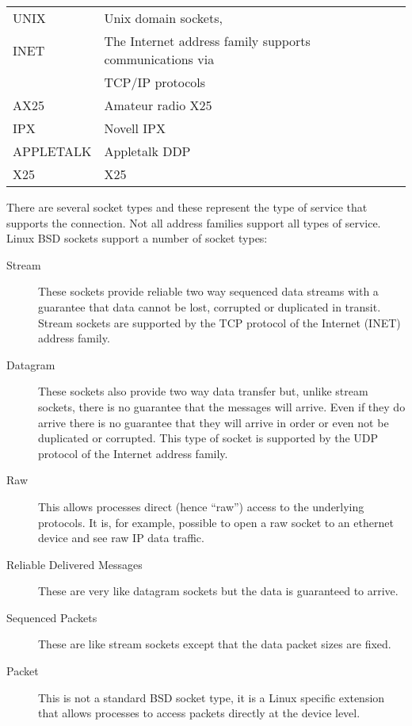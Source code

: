 \begin{tabular}{ll}
	UNIX		&	Unix domain sockets, \\
	INET		&	The Internet address family supports communications via \\
			&	TCP/IP protocols \\
	AX25		&	Amateur radio X25 \\
	IPX		&	Novell IPX \\
	APPLETALK	&	Appletalk DDP \\
	X25		&	X25 \\
\end{tabular}

There are several socket types and these represent the type of service that supports the connection.
Not all address families support all types of service.
Linux BSD sockets support a number of socket types:
\begin{description}
	\item [Stream] These sockets provide reliable two way sequenced data streams with a guarantee
		that data cannot be lost, corrupted or duplicated in transit.  Stream sockets are 
		supported by the TCP protocol of the Internet (INET) address family.
	\item [Datagram] These sockets also provide two way data transfer but, unlike stream sockets, 
		there is no guarantee that the messages will arrive.  Even if they do arrive there is
		no guarantee that they will arrive in order or even not be duplicated or corrupted.
		This type of socket is supported by the UDP protocol of the Internet address family.
	\item [Raw] This allows processes direct (hence ``raw'') access to the underlying protocols.
		It is, for example, possible to open a raw socket to an ethernet device and see
		raw IP data traffic.
	\item [Reliable Delivered Messages] These are very like datagram sockets but the data is
		guaranteed to arrive.
	\item [Sequenced Packets] These are like stream sockets except that the data packet sizes
		are fixed.
	\item [Packet] This is not a standard BSD socket type, it is a Linux specific extension that
		 allows processes to access packets directly at the device level.  
\end{description}

